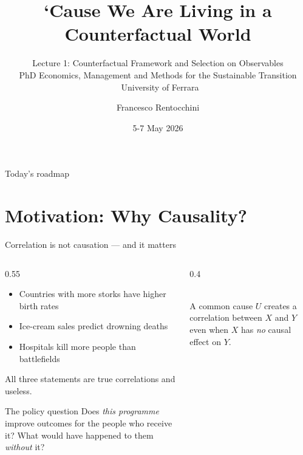 \documentclass[aspectratio=169, 10pt]{beamer}
\title['Cause We Are Living in a Counterfactual World]{%
  `Cause We Are Living in a Counterfactual World}
\subtitle{Lecture 1: Counterfactual Framework and Selection on Observables\\
  {\small\normalfont\color{ecgray} PhD Economics, Management and Methods for the Sustainable Transition \textbullet\ University of Ferrara}}
\author{Francesco Rentocchini}
\institute{European Commission, JRC-Seville / DEMM, University of Milan}
\date{5-7 May 2026}
\begin{document}

\begin{frame}
  \titlepage
\end{frame}

\begin{frame}{Today's roadmap}
  \tableofcontents
\end{frame}

\section{Motivation: Why Causality?}

\begin{frame}{Correlation is not causation — and it matters}

  \begin{columns}[T]
    \begin{column}{0.55\textwidth}
      \begin{itemize}
        \item Countries with more storks have higher birth rates
        \item Ice-cream sales predict drowning deaths
        \item Hospitals kill more people than battlefields
      \end{itemize}
      \bigskip
      All three statements are \alert{true correlations} and \alert{useless}.

      \bigskip
      \begin{block}{The policy question}
        Does \emph{this programme} improve outcomes for the people who receive it?
        What would have happened to them \emph{without} it?
      \end{block}
    \end{column}
    \begin{column}{0.4\textwidth}
       \\
      \vspace{2mm}
      \small A common cause $U$ creates a correlation between $X$ and $Y$ even when $X$ has \emph{no} causal effect on $Y$.
    \end{column}
  \end{columns}
\end{frame}
\end{document}
